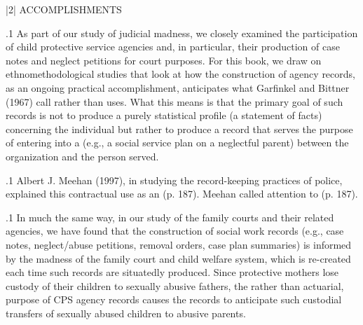 \documentclass[11pt, twoside]{article}
\begin{document}
{\s|2|{ ACCOMPLISHMENTS}

\p.1{%
As part of our study of judicial madness, we closely examined the participation of child protective service agencies and, in particular, their
production of case notes and neglect petitions for court purposes. For
this book, we draw on ethnomethodological studies that look at how
the construction of agency records, as an ongoing practical accomplishment, anticipates what Garfinkel and Bittner (1967) call 
rather than  uses. What this means is that the primary goal
of such records is not to produce a purely statistical profile (a statement
of facts) concerning the individual but rather to produce a record that
serves the purpose of entering into a  (e.g., a social service
plan on a neglectful parent) between the organization and the person
served.
}%

\p.1{%
Albert J. Meehan (1997), in studying the record-keeping practices of police,
explained this contractual use as an  (p. 187). Meehan called
attention to 
(p. 187).
}%

\p.1{%
In much the same way, in our study of the family courts and their
related agencies, we have found that the construction of social work
records (e.g., case notes, neglect/abuse petitions, removal orders, case
plan summaries) is informed by the madness of the family court and
child welfare system, which is re-created each time such records are
situatedly produced. Since protective mothers lose custody of their
children to sexually abusive fathers, the  rather than actuarial, purpose of CPS agency records causes the records to anticipate such custodial transfers of sexually abused children to abusive parents.
}%

}
\end{document}
